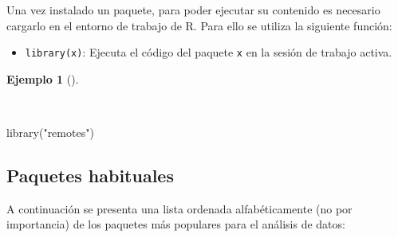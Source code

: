\documentclass[
  spanish,
  a4paper,
]{scrreport}
\newenvironment{Shaded}{\begin{snugshade}}{\end{snugshade}}
\newcommand{\FunctionTok}[1]{\textcolor[rgb]{0.28,0.35,0.67}{#1}}
\newcommand{\NormalTok}[1]{\textcolor[rgb]{0.00,0.23,0.31}{#1}}
\newcommand{\StringTok}[1]{\textcolor[rgb]{0.13,0.47,0.30}{#1}}
\providecommand{\tightlist}{%
  \setlength{\itemsep}{0pt}\setlength{\parskip}{0pt}}
\theoremstyle{definition}
\theoremstyle{definition}
\newtheorem{example}{Ejemplo}[chapter]
\theoremstyle{remark}
\begin{document}
Una vez instalado un paquete, para poder ejecutar su contenido es
necesario cargarlo en el entorno de trabajo de R. Para ello se utiliza
la siguiente función:

\begin{itemize}
\tightlist
\item
  \texttt{library(x)}: Ejecuta el código del paquete \texttt{x} en la
  sesión de trabajo activa.
\end{itemize}

\begin{example}[]\protect\hypertarget{exm-carga-paquetes}{}\label{exm-carga-paquetes}

~

\begin{Shaded}
\begin{Highlighting}[]
\FunctionTok{library}\NormalTok{(}\StringTok{"remotes"}\NormalTok{)}
\end{Highlighting}
\end{Shaded}

\end{example}

\subsection{Paquetes habituales}\label{paquetes-habituales}

A continuación se presenta una lista ordenada alfabéticamente (no por
importancia) de los paquetes más populares para el análisis de datos:
\end{document}
